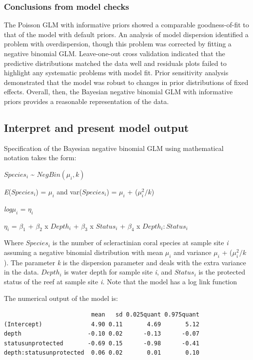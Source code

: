 \documentclass[
]{book}
\begin{document}
\hypertarget{nb-checkconc}{%
\subsubsection{Conclusions from model checks}\label{nb-checkconc}}

The Poisson GLM with informative priors showed a comparable goodness-of-fit to that of the model with default priors. An analysis of model dispersion identified a problem with overdispersion, though this problem was corrected by fitting a negative binomial GLM. Leave-one-out cross validation indicated that the predictive distributions matched the data well and residuals plots failed to highlight any systematic problems with model fit. Prior sensitivity analysis demonstrated that the model was robust to changes in prior distributions of fixed effects. Overall, then, the Bayesian negative binomial GLM with informative priors provides a reasonable representation of the data.

\hypertarget{nb-present}{%
\subsection{Interpret and present model output}\label{nb-present}}

Specification of the Bayesian negative binomial GLM using mathematical notation takes the form:

\(Species_{i}\) \textasciitilde{} \(NegBin(\mu_{i}, k)\)

\emph{E}(\(Species_{i}\)) = \(\mu_i\) and var(\(Species_{i}\)) = \(\mu_i\) + (\(\mu_i^2 / k\))

\emph{log}\(\mu_i\) = \(\eta_i\)

\(\eta_i\) = \(\beta_1\) + \(\beta_2\) x \(Depth_{i}\) + \(\beta_3\) x \(Status_{i}\) + \(\beta_4\) x \(Depth_{i} : Status_{i}\)

Where \(Species_{i}\) is the number of scleractinian coral species at sample site \emph{i} assuming a negative binomial distribution with mean \(\mu_i\) and variance \(\mu_i\) + (\(\mu_i^2 / k\)). The parameter \emph{k} is the dispersion parameter and deals with the extra variance in the data. \(Depth_{i}\) is water depth for sample site \emph{i}, and \(Status_{i}\) is the protected status of the reef at sample site \emph{i.} Note that the model has a log link function

The numerical output of the model is:

\begin{verbatim}
                         mean   sd 0.025quant 0.975quant
(Intercept)              4.90 0.11       4.69       5.12
depth                   -0.10 0.02      -0.13      -0.07
statusunprotected       -0.69 0.15      -0.98      -0.41
depth:statusunprotected  0.06 0.02       0.01       0.10
\end{verbatim}
\end{document}
